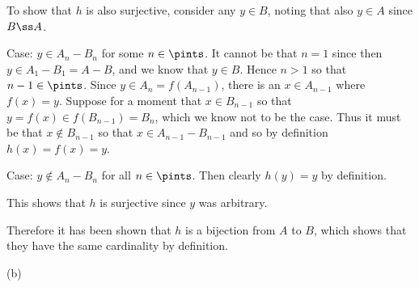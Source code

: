 {{    To show that $h$ is also surjective, consider any $y \in B$, noting that also $y \in A$ since $B \ss A$.

    Case: $y \in A_n - B_n$ for some $n \in \pints$.
    It cannot be that $n = 1$ since then $y \in A_1 - B_1 = A - B$, and we know that $y \in B$.
    Hence $n > 1$ so that $n-1 \in \pints$.
    Since $y \in A_n = f(A_{n-1})$, there is an $x \in A_{n-1}$ where $f(x) = y$.
    Suppose for a moment that $x \in B_{n-1}$ so that $y = f(x) \in f(B_{n-1}) = B_n$, which we know not to be the case.
    Thus it must be that $x \notin B_{n-1}$ so that $x \in A_{n-1} - B_{n-1}$ and so by definition $h(x) = f(x) = y$.

    Case: $y \notin A_n - B_n$ for all $n \in \pints$.
    Then clearly $h(y) = y$ by definition.

    This shows that $h$ is surjective since $y$ was arbitrary.

    Therefore it has been shown that $h$ is a bijection from $A$ to $B$, which shows that they have the same cardinality by definition.
  }

  (b)
}

